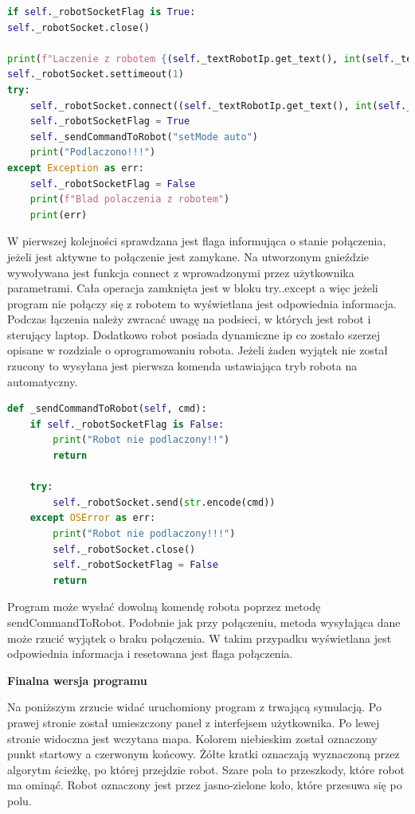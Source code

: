 \begin{lstlisting}[language=Python,caption=Nawiązanie połączenia,label={kodPythonGniazdo}]
if self._robotSocketFlag is True:
self._robotSocket.close()

print(f"Laczenie z robotem {(self._textRobotIp.get_text(), int(self._textRobotPort.get_text()))}")
self._robotSocket.settimeout(1)
try:
    self._robotSocket.connect((self._textRobotIp.get_text(), int(self._textRobotPort.get_text())))
    self._robotSocketFlag = True
    self._sendCommandToRobot("setMode auto")
    print("Podlaczono!!!")
except Exception as err:
    self._robotSocketFlag = False
    print(f"Blad polaczenia z robotem")
    print(err)
\end{lstlisting}
W pierwszej kolejności sprawdzana jest flaga informująca o stanie połączenia, jeżeli jest aktywne to połączenie jest zamykane.
Na utworzonym gnieździe wywoływana jest funkcja connect z wprowadzonymi przez użytkownika parametrami.
Cała operacja zamknięta jest w bloku try..except a więc jeżeli program nie połączy się z robotem to wyświetlana jest odpowiednia informacja. 
Podczas łączenia należy zwracać uwagę na podsieci, w których jest robot i sterujący laptop. 
Dodatkowo robot posiada dynamiczne ip co zostało szerzej opisane w rozdziale o oprogramowaniu robota.
Jeżeli żaden wyjątek nie został rzucony to wysyłana jest pierwsza komenda ustawiająca tryb robota na automatyczny.


\begin{lstlisting}[language=Python,caption=Wysyłanie komendy do robota,label={kodPythonSendCmd}]
def _sendCommandToRobot(self, cmd):
    if self._robotSocketFlag is False:
        print("Robot nie podlaczony!!")
        return
    
    try:
        self._robotSocket.send(str.encode(cmd))
    except OSError as err:
        print("Robot nie podlaczony!!!")
        self._robotSocket.close()
        self._robotSocketFlag = False
        return
\end{lstlisting}
Program może wysłać dowolną komendę robota poprzez metodę sendCommandToRobot. 
Podobnie jak przy połączeniu, metoda wysyłająca dane może rzucić wyjątek o braku połączenia. W takim przypadku
wyświetlana jest odpowiednia informacja i resetowana jest flaga połączenia. 



\textbf{Finalna wersja programu}

Na poniższym zrzucie widać uruchomiony program z trwającą symulacją. Po prawej stronie został umieszczony panel 
z interfejsem użytkownika. Po lewej stronie widoczna jest wczytana mapa. 
Kolorem niebieskim został oznaczony punkt startowy a czerwonym końcowy.
Żółte kratki oznaczają wyznaczoną przez algorytm ścieżkę, po której przejdzie robot. Szare pola to przeszkody, które robot ma ominąć. 
Robot oznaczony jest przez jasno-zielone koło, które przesuwa się po polu. 

